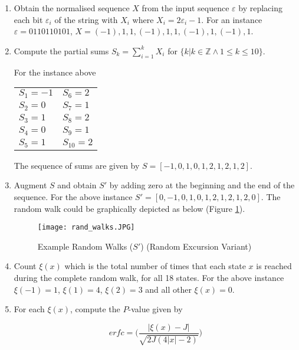 \begin{enumerate}
    \item Obtain the normalised sequence $X$ from the input sequence $\varepsilon$ by replacing each bit $\varepsilon_i$ of the string with $X_i$ where $X_i=2\varepsilon_i-1$. For an instance $\varepsilon=0110110101$, $X=(-1), 1, 1, (-1), 1, 1, (-1), 1, (-1), 1$.
    
    \item Compute the partial sums $S_k=\sum_{i=1}^{k}X_i$ for $\{k\lvert k \in \mathbb{Z}\land 1 \leq k \leq 10\}$.
    
    For the instance above
    
    \begin{table}[h!]
        \centering
        \begin{tabular}{ll}
            $S_1=-1$ & $S_6=2$ \\
            $S_2=0$ & $S_7=1$ \\
            $S_3=1$ & $S_8=2$ \\
            $S_4=0$ & $S_9=1$ \\
            $S_5=1$ & $S_{10}=2$
        \end{tabular}
    \end{table}
    
    The sequence of sums are given by $S=[-1, 0, 1, 0, 1, 2, 1, 2, 1, 2]$.
    
    \item Augment $S$ and obtain $S'$ by adding zero at the beginning and the end of the sequence. For the above instance $S'=[0, -1, 0, 1, 0, 1, 2, 1, 2, 1, 2, 0]$. The random walk could be graphically depicted as below (Figure \ref{fig:revt1_walks}).
    
    \begin{figure}[h!]
        \texttt{[image: rand\_walks.JPG]}
        \centering
        \caption{Example Random Walks ($S'$) (Random Excursion Variant)}
        \label{fig:revt1_walks}
    \end{figure}
    
    \item Count $\xi(x)$ which is the total number of times that each state $x$ is reached during the complete random walk, for all 18 states. For the above instance $\xi(-1)=1$, $\xi(1)=4$, $\xi(2)=3$ and all other $\xi(x)=0$.
    
    \item For each $\xi(x)$, compute the $P$-value given by
    
    \[
        \textit{erfc}=\Bigg(\dfrac{\lvert \xi(x)-J \rvert}{\sqrt{2J(4\lvert x \rvert-2)}}\Bigg)
    \]
    
\end{enumerate}


